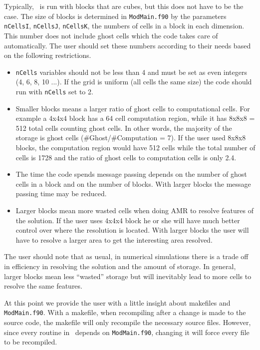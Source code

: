 Typically, \BATSRUS\ is run with blocks that are cubes, but this does not have to
be the case.  The size of blocks is determined in {\tt ModMain.f90} by the parameters 
{\tt nCellsI}, {\tt nCellsJ}, {\tt nCellsK}, the numbers of cells in a block
in each dimension.  This number does not include ghost cells which the code
takes care of automatically.  The user should set these numbers according to
their needs based on the following restrictions.
\begin{itemize}
\item {\tt nCells} variables should not be less than 4 and must be set as even
      integers (4, 6, 8, 10 ...). If the grid is uniform (all cells the same size)
      the code should run with {\tt nCells} set to 2.
\item Smaller blocks means a larger ratio of ghost cells to computational cells.
      For example a 4x4x4 block has a 64 cell computation region, while
      it has 8x8x8 = 512 total cells counting ghost cells.  In other words,
      the majority of the storage is ghost cells (\#Ghost/\#Computation = 7).
      If the user used 8x8x8 blocks, the computation region would have 512 
      cells while the total number of cells is 1728 and the ratio of ghost cells
      to computation cells is only 2.4.
\item The time the code spends message passing depends on the number of
      ghost cells in a block and on the number of blocks.  With larger blocks
      the message passing time may be reduced.
\item Larger blocks mean more wasted cells when doing AMR to resolve
      features of the solution.  If the user uses 4x4x4 block he or she will
      have much better control over where the resolution is located.  With larger
      blocks the user will have to resolve a larger area to get the interesting
      area resolved.
\end{itemize}
The user should note that as usual, in numerical simulations there is a trade off
in efficiency in resolving the solution and the amount of storage.  In general,
larger blocks mean less ``wasted'' storage but will inevitably lead to more cells
to resolve the same features.

At this point we provide the user with a little insight about makefiles and 
{\tt ModMain.f90}.  With a makefile, when recompiling after a change is 
made to the source
code, the makefile will only recompile the necessary source files.  However,
since every routine in \BATSRUS\ depends on {\tt ModMain.f90}, changing it will
force every file to be recompiled.

